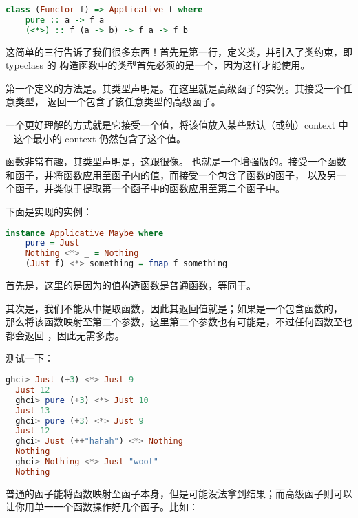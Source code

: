 \documentclass[./main.tex]{subfiles}
\begin{document}
\begin{lstlisting}[language=Haskell]
  class (Functor f) => Applicative f where
    pure :: a -> f a
    (<*>) :: f (a -> b) -> f a -> f b
\end{lstlisting}

这简单的三行告诉了我们很多东西！首先是第一行，定义类，并引入了类约束，即 typeclass 的
构造函数中的类型首先必须的是一个，因为这样才能使用。

第一个定义的方法是。其类型声明是。在这里就是高级函子的实例。其接受一个任意类型，
返回一个包含了该任意类型的高级函子。

一个更好理解的方式就是它接受一个值，将该值放入某些默认（或纯）context 中 -- 这个最小的 context 仍然包含了这个值。

\acode{<*>}函数非常有趣，其类型声明是，这跟很像。
也就是一个增强版的。接受一个函数和函子，并将函数应用至函子内的值，而\acode{<*>}接受一个包含了函数的函子，
以及另一个函子，并类似于提取第一个函子中的函数应用至第二个函子中。

下面是实现的实例：

\begin{lstlisting}[language=Haskell]
  instance Applicative Maybe where
    pure = Just
    Nothing <*> _ = Nothing
    (Just f) <*> something = fmap f something
\end{lstlisting}

首先是，这里的是因为的值构造函数是普通函数，等同于。

其次是\acode{<*>}，我们不能从中提取函数，因此其返回值就是；如果是一个包含函数的，
那么将该函数映射至第二个参数，这里第二个参数也有可能是，不过任何函数至也都会返回
，因此无需多虑。

测试一下：

\begin{lstlisting}[language=Haskell]
  ghci> Just (+3) <*> Just 9
  Just 12
  ghci> pure (+3) <*> Just 10
  Just 13
  ghci> pure (+3) <*> Just 9
  Just 12
  ghci> Just (++"hahah") <*> Nothing
  Nothing
  ghci> Nothing <*> Just "woot"
  Nothing
\end{lstlisting}

普通的函子能将函数映射至函子本身，但是可能没法拿到结果；而高级函子则可以让你用单一一个函数操作好几个函子。比如：
\end{document}
